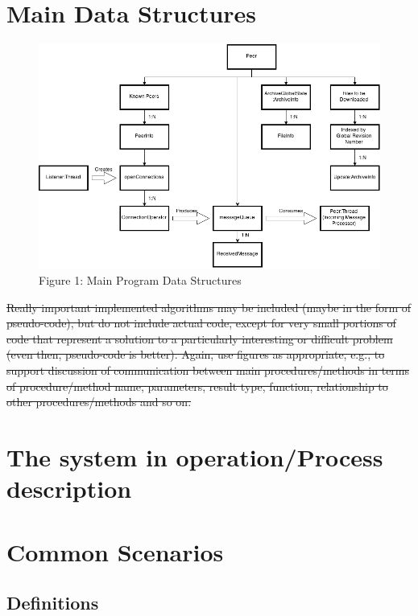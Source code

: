 \documentclass[12pt,a4paper,]{adreport}
\begin{document}
\section{Main Data Structures}\label{main-data-structures}

\begin{figure}[htbp]
\centering
\includegraphics{strucs.png}
\caption{Figure 1: Main Program Data Structures}
\end{figure}

\sout{Really important implemented algorithms may be included (maybe in
the form of pseudo-code), but do not include actual code, except for
very small portions of code that represent a solution to a particularly
interesting or difficult problem (even then, pseudo-code is better).
Again, use figures as appropriate, e.g., to support discussion of
communication between main procedures/methods in terms of
procedure/method name, parameters, result type, function, relationship
to other procedures/methods and so on.}

\section{The system in operation/Process
description}\label{the-system-in-operationprocess-description}

\section{Common Scenarios}\label{common-scenarios}

\subsection{Definitions}\label{definitions}
\end{document}
